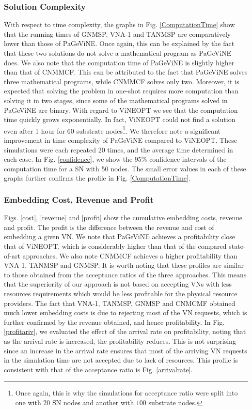 \documentclass[journal]{IEEEtran}
\begin{document}
\subsubsection{Solution Complexity}
With respect to time complexity, the graphs in Fig. \ref{ComputationTime} show that the running times of GNMSP, VNA-1 and TANMSP are comparatively lower than those of PaGeViNE. Once again, this can be explained by the fact that these two solutions do not solve a mathematical program as PaGeViNE does. We also note that the computation time of PaGeViNE is slightly higher than that of CNMMCF. This can be attributed to the fact that PaGeViNE solves three mathematical programs, while CNMMCF solves only two. Moreover, it is expected that solving the problem in one-shot requires more computation than solving it in two stages, since some of the mathematical programs solved in PaGeViNE are binary. With regard to ViNEOPT we see that the computation time quickly grows exponentially. In fact, ViNEOPT could not find a solution even after 1 hour for 60 substrate nodes\footnote{Once again, this is why the simulations for acceptance ratio were split into one with $20$ \ac{SN} nodes and another with $100$ substrate nodes.}. We therefore note a significant improvement in time complexity of PaGeViNE compared to ViNEOPT. These simulations were each repeated 20 times, and the average time determined in each case. In Fig. \ref{confidence}, we show the 95\% confidence intervals of the computation time for a \ac{SN} with 50 nodes. The small error values in each of these graphs further confirms the profile in Fig. \ref{ComputationTime}. 

\subsubsection{Embedding Cost, Revenue and Profit}
Figs. \ref{cost}, \ref{revenue} and \ref{profit} show the cumulative embedding costs, revenue and profit. The profit is the difference between the revenue and cost of embedding a given \ac{VN}. We note that PaGeViNE achieves a profitability close that of ViNEOPT, which is considerably higher than that of the compared state-of-art approaches. We also note CNMMCF achieves a higher profitability than VNA-1, TANMSP and GNMSP. It is worth noting that these profiles are similar to those obtained from the acceptance ratios of the three approaches. This means that the superiority of our approach is not based on accepting \acp{VN} with less resources requirements which would be less profitable for the physical resource providers. The fact that VNA-1, TANMSP, GNMSP and CNMCMF obtained much lower embedding costs is due to rejecting most of the \ac{VN} requests, which is further confirmed by the revenue obtained, and hence profitability. In Fig. \ref{profitariv}, we evaluated the effect of the arrival rate on profitability, noting that as the arrival rate is increased, the profitability reduces. This is not surprising since an increase in the arrival rate ensures that most of the arriving VN requests in the simulation time are not accepted due to lack of resources. This profile is consistent with that of the acceptance ratio is Fig. \ref{arrivalrate}.\\
\end{document}
